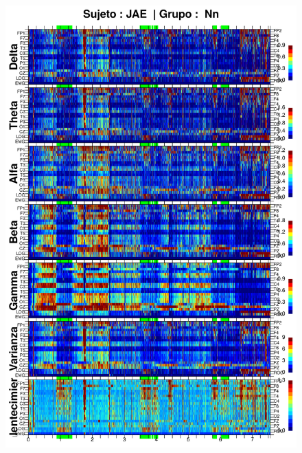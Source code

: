 \begin{figure}
\centering
\includegraphics[width=0.9\linewidth]
{./enlentecimiento/JANASUE_espectral_total.png} 
\end{figure}
